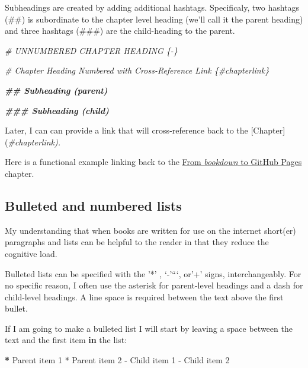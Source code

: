 \documentclass[
]{book}
\newenvironment{Shaded}{\begin{snugshade}}{\end{snugshade}}
\newcommand{\CommentTok}[1]{\textcolor[rgb]{0.56,0.35,0.01}{\textit{#1}}}
\newcommand{\ControlFlowTok}[1]{\textcolor[rgb]{0.13,0.29,0.53}{\textbf{#1}}}
\newcommand{\DecValTok}[1]{\textcolor[rgb]{0.00,0.00,0.81}{#1}}
\newcommand{\DocumentationTok}[1]{\textcolor[rgb]{0.56,0.35,0.01}{\textbf{\textit{#1}}}}
\newcommand{\ErrorTok}[1]{\textcolor[rgb]{0.64,0.00,0.00}{\textbf{#1}}}
\newcommand{\NormalTok}[1]{#1}
\newcommand{\SpecialCharTok}[1]{\textcolor[rgb]{0.00,0.00,0.00}{#1}}
\begin{document}
Subheadings are created by adding additional hashtags. Specificaly, two hashtags (\#\#) is subordinate to the chapter level heading (we'll call it the parent heading) and three hashtags (\#\#\#) are the child-heading to the parent.

\begin{Shaded}
\begin{Highlighting}[]
\CommentTok{\# UNNUMBERED CHAPTER HEADING \{{-}\}}

\CommentTok{\# Chapter Heading Numbered with Cross{-}Reference Link \{\#chapterlink\}}

\DocumentationTok{\#\# Subheading (parent)}

\DocumentationTok{\#\#\# Subheading (child)}
\end{Highlighting}
\end{Shaded}

\begin{Shaded}
\begin{Highlighting}[]
\NormalTok{Later, I can can provide a link that will cross}\SpecialCharTok{{-}}\NormalTok{reference back to the [Chapter](}\CommentTok{\#chapterlink).}
\end{Highlighting}
\end{Shaded}

Here is a functional example linking back to the \protect\hyperlink{book1}{From \emph{bookdown} to GitHub Pages} chapter.

\hypertarget{bulleted-and-numbered-lists}{%
\subsection{Bulleted and numbered lists}\label{bulleted-and-numbered-lists}}

My understanding that when books are written for use on the internet short(er) paragraphs and lists can be helpful to the reader in that they reduce the cognitive load.

Bulleted lists can be specified with the '*' , `-'```, or'+' signs, interchangeably. For no specific reason, I often use the asterisk for parent-level headings and a dash for child-level headings. A line space is required between the text above the first bullet.

\begin{Shaded}
\begin{Highlighting}[]
\NormalTok{If I am going to make a bulleted list I will start by leaving a space between the text and the first item }\ControlFlowTok{in}\NormalTok{ the list}\SpecialCharTok{:}

\ErrorTok{*}\NormalTok{ Parent item }\DecValTok{1}
\SpecialCharTok{*}\NormalTok{ Parent item }\DecValTok{2}
  \SpecialCharTok{{-}}\NormalTok{ Child item }\DecValTok{1}
  \SpecialCharTok{{-}}\NormalTok{ Child item }\DecValTok{2}
\end{Highlighting}
\end{Shaded}
\end{document}
